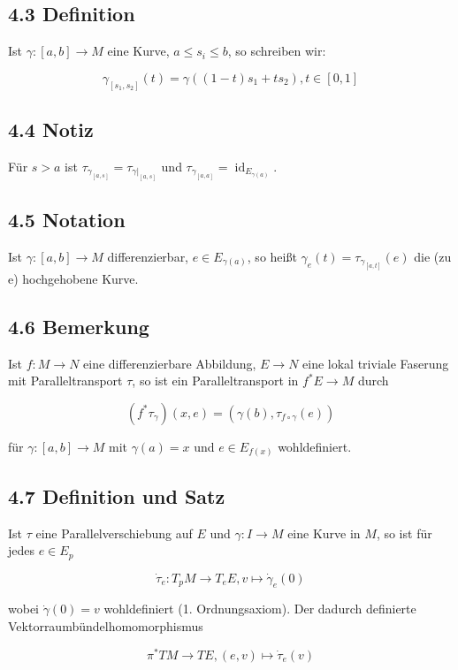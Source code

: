 \documentclass[10pt, letterpaper]{article}
\begin{document}
\subsection*{4.3 Definition}
Ist $\gamma:[a, b] \rightarrow M$ eine Kurve, $a \leq s_{i} \leq b$, so schreiben wir:

$$
\gamma_{\left[s_{1}, s_{2}\right]}(t)=\gamma\left((1-t) s_{1}+t s_{2}\right), t \in[0,1]
$$

\subsection*{4.4 Notiz}
Für $s>a$ ist $\tau_{\gamma_{[a, s]}}=\tau_{\left.\gamma\right|_{[a, s]}}$ und $\tau_{\gamma_{[a, a]}}=\operatorname{id}_{E_{\gamma(a)}}$.

\subsection*{4.5 Notation}
Ist $\gamma:[a, b] \rightarrow M$ differenzierbar, $e \in E_{\gamma(a)}$, so heißt $\gamma_{e}(t)=\tau_{\gamma_{[a, t]}}(e)$ die (zu e) hochgehobene Kurve.

\subsection*{4.6 Bemerkung}
Ist $f: M \rightarrow N$ eine differenzierbare Abbildung, $E \rightarrow N$ eine lokal triviale Faserung mit Paralleltransport $\tau$, so ist ein Paralleltransport in $f^{*} E \rightarrow M$ durch

$$
\left(f^{*} \tau_{\gamma}\right)(x, e)=\left(\gamma(b), \tau_{f \circ \gamma}(e)\right)
$$

für $\gamma:[a, b] \rightarrow M$ mit $\gamma(a)=x$ und $e \in E_{f(x)}$ wohldefiniert.

\subsection*{4.7 Definition und Satz}
Ist $\tau$ eine Parallelverschiebung auf $E$ und $\gamma: I \rightarrow M$ eine Kurve in $M$, so ist für jedes $e \in E_{p}$

$$
\dot{\tau}_{e}: T_{p} M \rightarrow T_{e} E, v \mapsto \dot{\gamma}_{e}(0)
$$

wobei $\dot{\gamma}(0)=v$ wohldefiniert (1. Ordnungsaxiom). Der dadurch definierte Vektorraumbündelhomomorphismus

$$
\pi^{*} T M \rightarrow T E,(e, v) \mapsto \dot{\tau}_{e}(v)
$$
\end{document}
